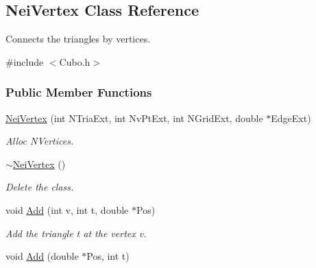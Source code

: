 \hypertarget{classNeiVertex}{}\subsection{Nei\+Vertex Class Reference}
\label{classNeiVertex}


Connects the triangles by vertices.  




{\ttfamily \#include $<$Cubo.\+h$>$}

\subsubsection*{Public Member Functions}
\begin{DoxyCompactItemize}
\item 
\hyperlink{classNeiVertex_acd292e575bf4ade488a69f62b2d454ad}{Nei\+Vertex} (int N\+Tria\+Ext, int Nv\+Pt\+Ext, int N\+Grid\+Ext, double $\ast$Edge\+Ext)\hypertarget{classNeiVertex_acd292e575bf4ade488a69f62b2d454ad}{}\label{classNeiVertex_acd292e575bf4ade488a69f62b2d454ad}

\begin{DoxyCompactList}\small\item\em Alloc N\+Vertices. \end{DoxyCompactList}\item 
\hyperlink{classNeiVertex_ab53f242febf6312ccd82ee9c28c2b633}{$\sim$\+Nei\+Vertex} ()\hypertarget{classNeiVertex_ab53f242febf6312ccd82ee9c28c2b633}{}\label{classNeiVertex_ab53f242febf6312ccd82ee9c28c2b633}

\begin{DoxyCompactList}\small\item\em Delete the class. \end{DoxyCompactList}\item 
void \hyperlink{classNeiVertex_ab46ead706c925650dc870081c73da25f}{Add} (int v, int t, double $\ast$Pos)\hypertarget{classNeiVertex_ab46ead706c925650dc870081c73da25f}{}\label{classNeiVertex_ab46ead706c925650dc870081c73da25f}

\begin{DoxyCompactList}\small\item\em Add the triangle t at the vertex v. \end{DoxyCompactList}\item 
void \hyperlink{classNeiVertex_a23175dfa70c692054cf173193a6d4d6e}{Add} (double $\ast$Pos, int t)\hypertarget{classNeiVertex_a23175dfa70c692054cf173193a6d4d6e}{}\label{classNeiVertex_a23175dfa70c692054cf173193a6d4d6e}


\end{DoxyCompactItemize}
